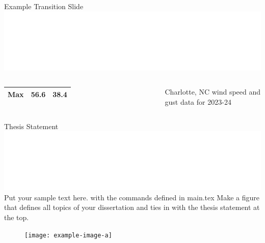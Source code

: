 \begin{frame}[t]{Example Transition Slide \hfill \includegraphics[height=.5cm]{figs/uncc/whiteUNCCLogo.eps}}
\begin{columns}
{\begin{table}[h!]
{\begin{tabular}{p{2.2cm}p{2.2cm}p{2.2cm}}
                    Max & 56.6 & 38.4 \\ \hline \hline
                    \end{tabular}}
                \end{table}
            }
            \small{Charlotte, NC wind speed and gust data for 2023-24 \cite{cltWind}}
    \end{columns}
    
\end{frame}

\begin{frame}{Thesis Statement \hfill \includegraphics[height=.5cm]{figs/uncc/whiteUNCCLogo.eps}}
    {Put your sample text here.   with the commands defined in main.tex}
    \vspace{-0.2cm}
    Make a figure that defines all topics of your dissertation and ties in with the thesis statement at the top.
    \begin{figure}
        \centering
        \texttt{[image: example-image-a]}
    \end{figure}
\end{frame}


